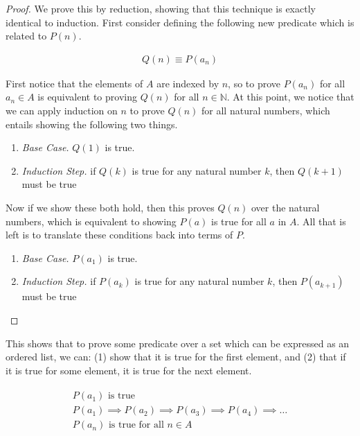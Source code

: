 \documentclass[twoside]{report}
\begin{document}
\begin{proof}
	We prove this by reduction, showing that this technique is exactly identical to induction. First consider defining the following new predicate which is related to $P(n)$.
	
	\begin{align*}
		Q(n) \equiv P(a_n)
	\end{align*}
	
	First notice that the elements of $A$ are indexed by $n$, so to prove $P(a_n)$ for all $a_n \in A$ is equivalent to proving $Q(n)$ for all $n \in \mathbb{N}$. At this point, we notice that we can apply induction on $n$ to prove $Q(n)$ for all natural numbers, which entails showing the following two things.
	
	\vspace{\baselineskip}
	\begin{enumerate}
		\item \emph{Base Case.} $Q(1)$ is true.
		\item \emph{Induction Step.} if $Q(k)$ is true for any natural number $k$, then $Q(k + 1)$ must be true
	\end{enumerate}
	\vspace{\baselineskip}
	
	Now if we show these both hold, then this proves $Q(n)$ over the natural numbers, which is equivalent to showing $P(a)$ is true for all $a$ in $A$. All that is left is to translate these conditions back into terms of $P$.
	
	\vspace{\baselineskip}
	\begin{enumerate}
		\item \emph{Base Case.} $P(a_1)$ is true.
		\item \emph{Induction Step.} if $P(a_k)$ is true for any natural number $k$, then $P(a_{k + 1})$ must be true
	\end{enumerate}
\end{proof}
\vspace{\baselineskip}

This shows that to prove some predicate over a set which can be expressed as an ordered list, we can: (1) show that it is true for the first element, and (2) that if it is true for some element, it is true for the next element.

\begin{align*}
	\begin{array}{l}
		P(a_1) \text{ is true} \\
		P(a_1) \implies P(a_2) \implies P(a_3) \implies P(a_4) \implies \dots \\
		\hline
		P(a_n) \text{ is true for all } n \in A
	\end{array}
\end{align*}
\end{document}
